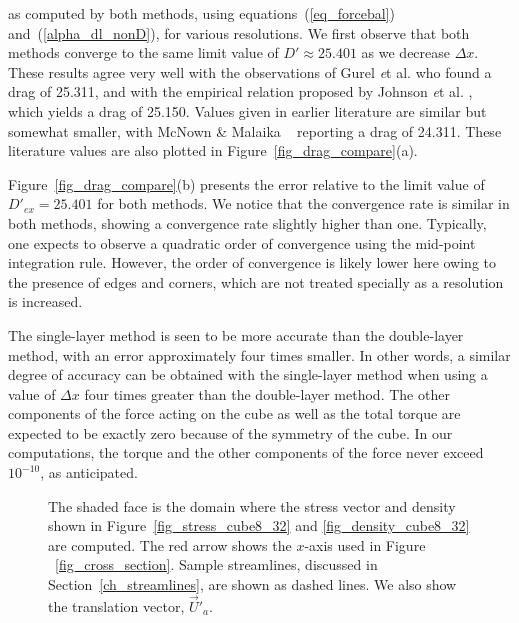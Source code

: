 as computed by both methods, using equations~(\ref{eq_forcebal}) and~(\ref{alpha_dl_nonD}), for various resolutions. We first observe that both methods converge to the same limit value of $D'  \approx 25.401$ as we decrease $\Delta x$.
These results agree very well with the observations of
Gurel {\textit et al.} 
\cite{gurel_studies_1955} who found a drag of 25.311, and with the empirical relation proposed by 
Johnson {\textit et al.} 
\cite{johnson_drag_1987}, which yields a drag of 25.150. Values given in earlier literature are similar but somewhat smaller, with 
 McNown \& Malaika ~\cite{mcnown_effects_1950} 
reporting a drag of 24.311. These literature values are also plotted in  Figure~\ref{fig_drag_compare}(a).
\par
Figure~\ref{fig_drag_compare}(b) presents the error relative to the limit value of $D'_{ex}  = 25.401$ for both methods.
We notice that the convergence rate is similar in both methods, showing a convergence rate slightly higher than one. 
 Typically, one expects to observe a quadratic order of convergence using the mid-point integration rule. However, the order of convergence is likely lower here owing to the presence of edges and corners, which are not treated specially as a resolution is increased.
 \par
The single-layer method is seen to be more accurate than the double-layer method, with an error approximately four times smaller. In other words, a similar degree of accuracy can be obtained with the single-layer method when using a value of $\Delta x$ four times greater than the double-layer method.
The other components of the force acting on the cube as well as the total torque are expected to be exactly zero because of the symmetry of the cube.
In our computations, the torque and the other components of the force never exceed $10^{-10}$, as anticipated. 

\begin{figure}[ht]
	\begin{center}
	\end{center}
	\caption{The shaded face is the domain where the stress vector and density shown in Figure~\ref{fig_stress_cube8_32} and	\ref{fig_density_cube8_32} are computed. The red arrow shows the $x$-axis used in Figure ~\ref{fig_cross_section}. Sample streamlines, discussed in Section~\ref{ch_streamlines}, are shown as dashed lines. We also show the translation vector,  $\vec{U}'_a$.}
	\label{fig_face_description}
\end{figure}


